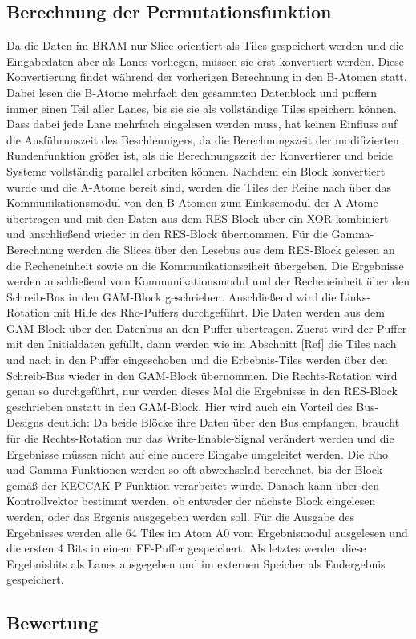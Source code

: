 \subsection{Berechnung der Permutationsfunktion}
Da die Daten im BRAM nur Slice orientiert als Tiles gespeichert werden und die Eingabedaten aber als Lanes vorliegen, müssen sie erst konvertiert werden.
Diese Konvertierung findet während der vorherigen Berechnung in den B-Atomen statt.
Dabei lesen die B-Atome mehrfach den gesammten Datenblock und puffern immer einen Teil aller Lanes, bis sie sie als vollständige Tiles speichern können.
Dass dabei jede Lane mehrfach eingelesen werden muss, hat keinen Einfluss auf die Ausführunszeit des Beschleunigers, da die Berechnungszeit der modifizierten Rundenfunktion größer ist,
als die Berechnungszeit der Konvertierer und beide Systeme vollständig parallel arbeiten können.
Nachdem ein Block konvertiert wurde und die A-Atome bereit sind, werden die Tiles der Reihe nach über das Kommunikationsmodul von den B-Atomen zum Einlesemodul der A-Atome übertragen
und mit den Daten aus dem RES-Block über ein XOR kombiniert und anschließend wieder in den RES-Block übernommen.
Für die Gamma-Berechnung werden die Slices über den Lesebus aus dem RES-Block gelesen an die Recheneinheit sowie an die Kommunikationseiheit übergeben.
Die Ergebnisse werden anschließend vom Kommunikationsmodul und der Recheneinheit über den Schreib-Bus in den GAM-Block geschrieben.
Anschließend wird die Links-Rotation mit Hilfe des Rho-Puffers durchgeführt. Die Daten werden aus dem GAM-Block über den Datenbus an den Puffer übertragen.
Zuerst wird der Puffer mit den Initialdaten gefüllt, dann werden wie im Abschnitt [Ref] die Tiles nach und nach in den Puffer eingeschoben
und die Erbebnis-Tiles werden über den Schreib-Bus wieder in den GAM-Block übernommen.
Die Rechts-Rotation wird genau so durchgeführt, nur werden dieses Mal die Ergebnisse in den RES-Block geschrieben anstatt in den GAM-Block.
Hier wird auch ein Vorteil des Bus-Designs deutlich: Da beide Blöcke ihre Daten über den Bus empfangen, braucht für die Rechts-Rotation nur das
Write-Enable-Signal verändert werden und die Ergebnisse müssen nicht auf eine andere Eingabe umgeleitet werden.
Die Rho und Gamma Funktionen werden so oft abwechselnd berechnet, bis der Block gemäß der KECCAK-P Funktion verarbeitet wurde.
Danach kann über den Kontrollvektor bestimmt werden, ob entweder der nächste Block eingelesen werden, oder das Ergenis ausgegeben werden soll.
Für die Ausgabe des Ergebnisses werden alle 64 Tiles im Atom A0 vom Ergebnismodul ausgelesen und die ersten 4 Bits in einem FF-Puffer gespeichert.
Als letztes werden diese Ergebnisbits als Lanes ausgegeben und im externen Speicher als Endergebnis gespeichert.

\subsection{Bewertung}

